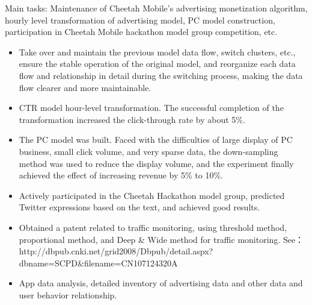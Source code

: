 \documentclass{resume}
\begin{document}
\begin{onehalfspacing}
Main tasks: Maintenance of Cheetah Mobile's advertising monetization algorithm, hourly level transformation of advertising model, PC model construction, participation in Cheetah Mobile hackathon model group competition, etc.
\begin{itemize}
  \item Take over and maintain the previous model data flow, switch clusters, etc., ensure the stable operation of the original model, and reorganize each data flow and relationship in detail during the switching process, making the data flow clearer and more maintainable.
  \item CTR model hour-level transformation. The successful completion of the transformation increased the click-through rate by about 5\%.
  \item The PC model was built. Faced with the difficulties of large display of PC business, small click volume, and very sparse data, the down-sampling method was used to reduce the display volume, and the experiment finally achieved the effect of increasing revenue by 5\% to 10\%.
  \item Actively participated in the Cheetah Hackathon model group, predicted Twitter expressions based on the text, and achieved good results.
  \item Obtained a patent related to traffic monitoring, using threshold method, proportional method, and Deep \& Wide method for traffic monitoring. See：http://dbpub.cnki.net/grid2008/Dbpub/detail.aspx?dbname=SCPD\&filename=CN107124320A
  \item App data analysis, detailed inventory of advertising data and other data and user behavior relationship.     
\end{itemize}
\end{onehalfspacing}
\end{document}
